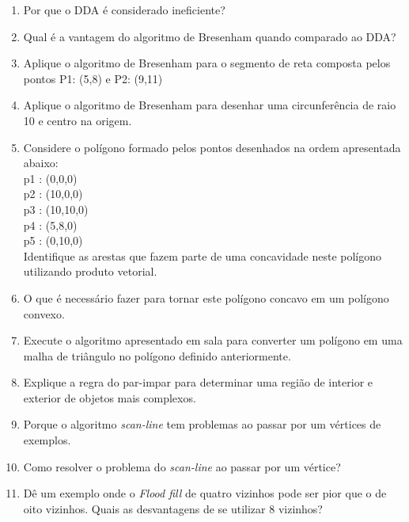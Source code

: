 \documentclass[12pt,a4paper]{article}
\begin{document}
\begin{enumerate}
	\item Por que o DDA é considerado ineficiente?
	
	\item Qual é a vantagem do algoritmo de Bresenham quando comparado ao DDA?
	
	\item Aplique o algoritmo de Bresenham para o segmento de reta composta pelos pontos P1: (5,8) e P2: (9,11)
	
	\item Aplique o algoritmo de Bresenham para desenhar uma circunferência de raio 10 e centro na origem.
	
	\item Considere o polígono formado pelos pontos desenhados na ordem apresentada abaixo:\\
	
		p1 : (0,0,0)\\
		p2 : (10,0,0)\\
		p3 : (10,10,0)\\
		p4 : (5,8,0)\\
		p5 : (0,10,0)\\

		Identifique as arestas que fazem parte de uma concavidade neste polígono
utilizando produto vetorial.

	\item O que é necessário fazer para tornar este polígono concavo em um polígono
convexo.

	\item Execute o algoritmo apresentado em sala para converter um polígono em
uma malha de triângulo no polígono definido anteriormente.

	\item Explique a regra do par-impar para determinar uma região de interior e
exterior de objetos mais complexos.

	\item Porque o algoritmo \textit{scan-line} tem problemas ao passar por um vértices de exemplos.
	
	\item Como resolver o problema do \textit{scan-line} ao passar por um vértice?

	\item Dê um exemplo onde o \textit{Flood fill} de quatro vizinhos pode ser pior que o de oito vizinhos. Quais as desvantagens de se utilizar 8 vizinhos?

\end{enumerate}
\end{document}
